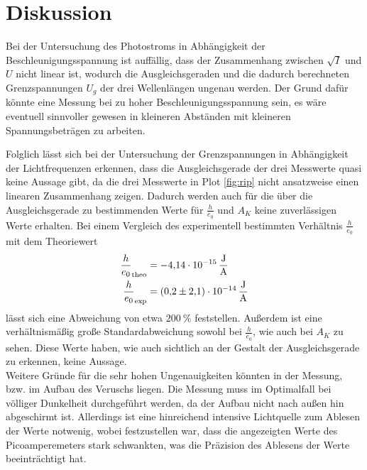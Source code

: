 \section{Diskussion}
\label{sec:Diskussion}

Bei der Untersuchung des Photostroms in Abhängigkeit der Beschleunigungsspannung ist auffällig, dass der Zusammenhang zwischen $\sqrt{I} $
und $U$ nicht linear ist, wodurch die Ausgleichsgeraden und die dadurch berechneten Grenzspannungen $U_g$  der drei Wellenlängen
ungenau werden. Der Grund dafür könnte eine Messung bei zu hoher Beschleunigungsspannung sein, es wäre eventuell sinnvoller gewesen in 
kleineren Abständen mit kleineren Spannungsbeträgen zu arbeiten. 

Folglich lässt sich bei der Untersuchung der Grenzspannungen in Abhängigkeit der Lichtfrequenzen erkennen, dass die Ausgleichsgerade der 
drei Messwerte quasi keine Aussage gibt, da die drei Messwerte in Plot \ref{fig:rip} nicht ansatzweise einen linearen Zusammenhang zeigen. 
Dadurch werden auch für die über die Ausgleichsgerade zu bestimmenden Werte für $\frac{h}{e_0} $ und $A_K $ keine zuverlässigen Werte 
erhalten. Bei einem Vergleich des experimentell bestimmten Verhältnis $\frac{h}{e_0} $ mit dem Theoriewert 
\begin{align*}
    \frac{h}{e_0}_\text{theo} &= \SI{-4.14e-15}{\frac{\joule}{\ampere}} \\
    \frac{h}{e_0}_\text{exp}  &= \SI{0.2(21)e-14}{\frac{\joule}{\ampere}}
\end{align*}
lässt sich eine Abweichung von etwa $\SI{200}{\percent} $ feststellen. Außerdem ist eine verhältnismäßig große Standardabweichung sowohl bei 
$\frac{h}{e_0} $, wie auch bei $A_K $ zu sehen. Diese Werte haben, wie auch sichtlich an der Gestalt der Ausgleichsgerade zu erkennen, 
keine Aussage. 
\\ Weitere Gründe für die sehr hohen Ungenauigkeiten könnten in der Messung, bzw. im Aufbau des Veruschs liegen. Die Messung muss im 
Optimalfall bei völliger Dunkelheit durchgeführt werden, da der Aufbau nicht nach außen hin abgeschirmt ist. Allerdings ist eine hinreichend
intensive Lichtquelle zum Ablesen der Werte notwenig, wobei festzustellen war, dass die angezeigten Werte des Picoamperemeters stark 
schwankten, was die Präzision des Ablesens der Werte beeinträchtigt hat. 